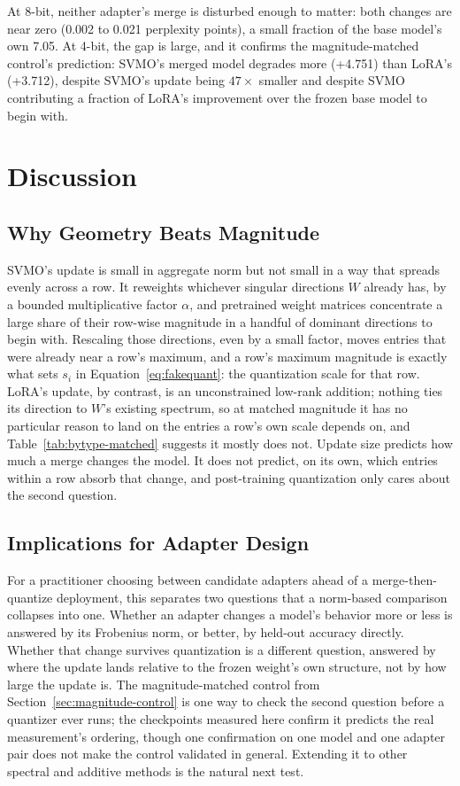 \documentclass[conference]{IEEEtran}
\begin{document}
At 8-bit, neither adapter's merge is disturbed enough to matter: both changes are near zero (0.002 to 0.021 perplexity points), a small fraction of the base model's own 7.05. At 4-bit, the gap is large, and it confirms the magnitude-matched control's prediction: SVMO's merged model degrades more (+4.751) than LoRA's (+3.712), despite SVMO's update being $47\times$ smaller and despite SVMO contributing a fraction of LoRA's improvement over the frozen base model to begin with.

\section{Discussion}
\label{sec:discussion}

\subsection{Why Geometry Beats Magnitude}

SVMO's update is small in aggregate norm but not small in a way that spreads evenly across a row. It reweights whichever singular directions $W$ already has, by a bounded multiplicative factor $\alpha$, and pretrained weight matrices concentrate a large share of their row-wise magnitude in a handful of dominant directions to begin with. Rescaling those directions, even by a small factor, moves entries that were already near a row's maximum, and a row's maximum magnitude is exactly what sets $s_i$ in Equation~\ref{eq:fakequant}: the quantization scale for that row. LoRA's update, by contrast, is an unconstrained low-rank addition; nothing ties its direction to $W$'s existing spectrum, so at matched magnitude it has no particular reason to land on the entries a row's own scale depends on, and Table~\ref{tab:bytype-matched} suggests it mostly does not. Update size predicts how much a merge changes the model. It does not predict, on its own, which entries within a row absorb that change, and post-training quantization only cares about the second question.

\subsection{Implications for Adapter Design}

For a practitioner choosing between candidate adapters ahead of a merge-then-quantize deployment, this separates two questions that a norm-based comparison collapses into one. Whether an adapter changes a model's behavior more or less is answered by its Frobenius norm, or better, by held-out accuracy directly. Whether that change survives quantization is a different question, answered by where the update lands relative to the frozen weight's own structure, not by how large the update is. The magnitude-matched control from Section~\ref{sec:magnitude-control} is one way to check the second question before a quantizer ever runs; the checkpoints measured here confirm it predicts the real measurement's ordering, though one confirmation on one model and one adapter pair does not make the control validated in general. Extending it to other spectral and additive methods is the natural next test.
\end{document}
